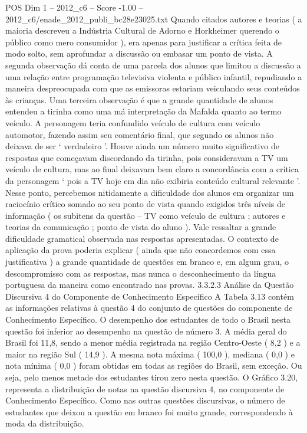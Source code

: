 \begin{textsample}{POS Dim 1 – 2012\_c6 – Score -1.00 – 2012\_c6/enade\_2012\_publi\_bc28e23025.txt}
Quando citados autores e teorias ( a maioria descreveu a Indústria Cultural de Adorno e Horkheimer querendo o público como mero consumidor ), era apenas para justificar a crítica feita de modo solto, sem aprofundar a discussão ou embasar um ponto de vista.
A segunda observação dá conta de uma parcela dos alunos que limitou a discussão a uma relação entre programação televisiva violenta e público infantil, repudiando a maneira despreocupada com que as emissoras estariam veiculando seus conteúdos às crianças.
Uma terceira observação é que a grande quantidade de alunos entendeu a tirinha como uma má interpretação da Mafalda quanto ao termo veículo.
A personagem teria confundido veículo de cultura com veículo automotor, fazendo assim seu comentário final, que segundo os alunos não deixava de ser ‘ verdadeiro ’.
Houve ainda um número muito significativo de respostas que começavam discordando da tirinha, pois consideravam a TV um veículo de cultura, mas ao final deixavam bem claro a concordância com a crítica da personagem ‘ pois a TV hoje em dia não exibiria conteúdo cultural relevante ’.
Nesse ponto, percebemos nitidamente a dificuldade dos alunos em organizar um raciocínio crítico somado ao seu ponto de vista quando exigidos três níveis de informação ( os subitens da questão – TV como veículo de cultura ; autores e teorias da comunicação ; ponto de vista do aluno ).
Vale ressaltar a grande dificuldade gramatical observada nas respostas apresentadas.
O contexto de aplicação da prova poderia explicar ( ainda que não concordemos com essa justificativa ) a grande quantidade de questões em branco e, em algum grau, o descompromisso com as respostas, mas nunca o desconhecimento da língua portuguesa da maneira como encontrado nas provas. 3.3.2.3 Análise da Questão Discursiva 4 do Componente de Conhecimento Específico A Tabela 3.13 contém as informações relativas à questão 4 do conjunto de questões do componente de Conhecimento Específico.
O desempenho dos estudantes de todo o Brasil nesta questão foi inferior ao desempenho na questão de número 3.
A média geral do Brasil foi 11,8, sendo a menor média registrada na região Centro-Oeste ( 8,2 ) e a maior na região Sul ( 14,9 ).
A mesma nota máxima ( 100,0 ), mediana ( 0,0 ) e nota mínima ( 0,0 ) foram obtidas em todas as regiões do Brasil, sem exceção.
Ou seja, pelo menos metade dos estudantes tirou zero nesta questão.
O Gráfico 3.20, representa a distribuição de notas na questão discursiva 4, no componente de Conhecimento Específico.
Como nas outras questões discursivas, o número de estudantes que deixou a questão em branco foi muito grande, correspondendo à moda da distribuição.

\end{textsample}
